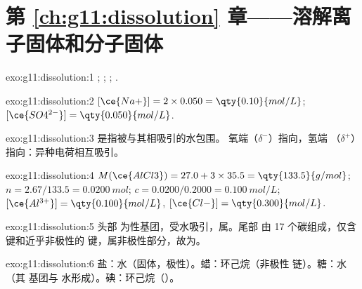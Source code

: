 \section*{第 \ref{ch:g11:dissolution} 章——溶解离子固体和分子固体}

\begin{solution}{exo:g11:dissolution:1}
;
;
;
.
\end{solution}

\begin{solution}{exo:g11:dissolution:2}
$[\ce{Na+}] = 2 \times 0.050 = \qty{0.10}{mol/L}$;
$[\ce{SO4^{2-}}] = \qty{0.050}{mol/L}$.
\end{solution}

\begin{solution}{exo:g11:dissolution:3}
是指被与其相吸引的水包围。
氧端（$\delta^-$）指向，氢端
（$\delta^+$）指向：异种电荷相互吸引。
\end{solution}

\begin{solution}{exo:g11:dissolution:4}
$M(\ce{AlCl3}) = 27.0 + 3 \times 35.5 = \qty{133.5}{g/mol}$;
$n = 2.67 / 133.5 = \qty{0.0200}{mol}$; $c = 0.0200 / 0.2000 =
\qty{0.100}{mol/L}$; $[\ce{Al^{3+}}] = \qty{0.100}{mol/L}$,
$[\ce{Cl-}] = \qty{0.300}{mol/L}$.
\end{solution}

\begin{solution}{exo:g11:dissolution:5}
头部  为性基团，受水吸引，属。尾部
由 17 个碳组成，仅含  键和近乎非极性的 
键，属非极性部分，故为。
\end{solution}

\begin{solution}{exo:g11:dissolution:6}
盐：水（固体，极性）。蜡：环己烷（非极性
链）。糖：水（其  基团与
水形成）。碘：环己烷（）。
\end{solution}

